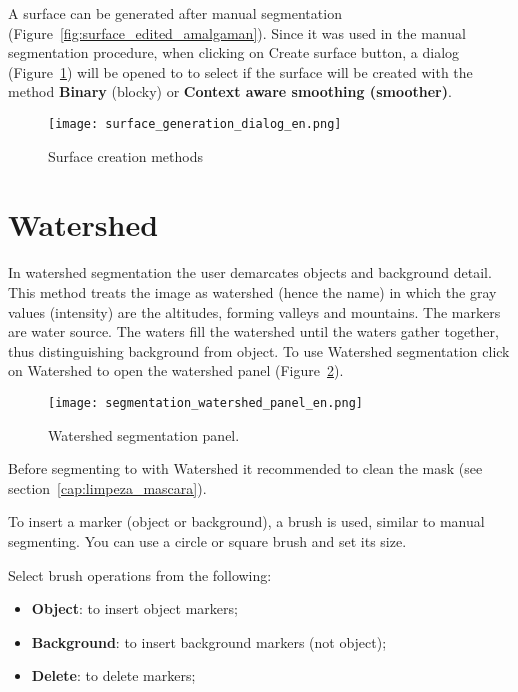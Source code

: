 A surface can be generated after manual segmentation (Figure~\ref{fig:surface_edited_amalgaman}). Since it was used in the manual segmentation procedure, when clicking on Create surface button, a dialog (Figure~\ref{fig:new_surface_edited}) will be opened to to select if the surface will be created with the method \textbf{Binary} (blocky) or \textbf{Context aware smoothing (smoother)}.

\begin{figure}[!htb]
\centering
\texttt{[image: surface\_generation\_dialog\_en.png]}
\caption{Surface creation methods}
\label{fig:new_surface_edited}
\end{figure}


\section{Watershed}

In watershed segmentation the user demarcates objects and background detail. This method treats the image as watershed (hence the name) in which the gray values (intensity) are the altitudes, forming valleys and mountains. The markers are water source. The waters fill the watershed until the waters gather together, thus distinguishing background from object. To use Watershed segmentation click on Watershed to open the watershed panel (Figure~\ref{fig:watershed_painel}).

\begin{figure}[!htb]
\centering
\texttt{[image: segmentation\_watershed\_panel\_en.png]}
\caption{Watershed segmentation panel.}
\label{fig:watershed_painel}
\end{figure}

Before segmenting to with Watershed it recommended to clean the mask (see section~\ref{cap:limpeza_mascara}).

To insert a marker (object or background), a brush is used, similar to manual segmenting. You can use a circle or square brush and set its size.

Select brush operations from the following:

\begin{itemize}
    \item \textbf{Object}: to insert object markers;
    \item \textbf{Background}: to insert background markers (not object);
    \item \textbf{Delete}: to delete markers;
\end{itemize}


